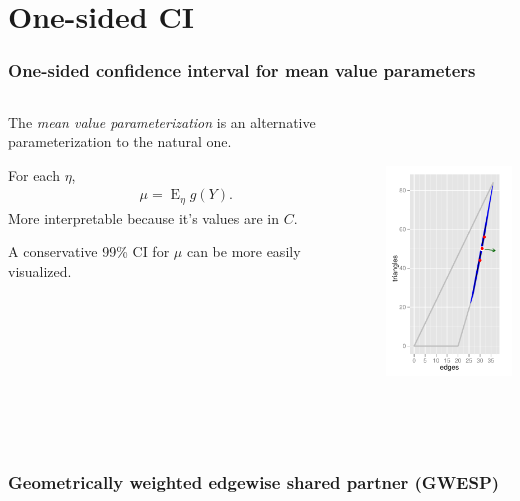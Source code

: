 \documentclass[ 10pt]{beamer}
\DeclareMathOperator{\E}{E}
\begin{document}
\section{One-sided CI}
\frame
{
\frametitle{One-sided confidence interval for mean value parameters}  
\begin{columns}[]
\begin{column}[t]{0.6\textwidth}

The \emph{mean value parameterization} is an alternative parameterization to the natural one.

For each $\eta$,
\begin{align*}
	\mu = \E_\eta g(Y).
\end{align*}
More interpretable because it's values are in $C$.
\vspace{2mm}

A conservative 99\% CI for $\mu$ 
can be more easily visualized.
\end{column}

\begin{column}[T]{0.4\textwidth}
\includegraphics[height=3.3in]{CI99-muspace} %
\end{column}
\end{columns}
}

\frame
{
\frametitle{Geometrically weighted edgewise shared partner (GWESP)}

}

%
%
\end{document}
